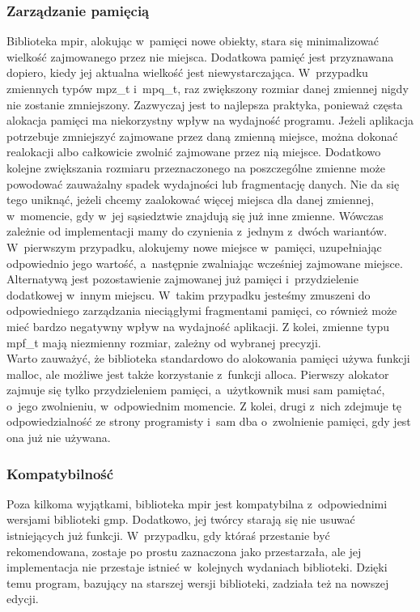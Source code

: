 \subsubsection{Zarządzanie pamięcią}
Biblioteka mpir, alokując w~pamięci nowe obiekty, stara się minimalizować wielkość zajmowanego przez nie miejsca. Dodatkowa pamięć jest przyznawana dopiero, kiedy jej aktualna wielkość jest niewystarczająca. W~przypadku zmiennych typów mpz\_t i~mpq\_t, raz zwiększony rozmiar danej zmiennej nigdy nie zostanie zmniejszony. Zazwyczaj jest to najlepsza praktyka, ponieważ częsta alokacja pamięci ma niekorzystny wpływ na wydajność programu. Jeżeli aplikacja potrzebuje zmniejszyć zajmowane przez daną zmienną miejsce, można dokonać realokacji albo całkowicie zwolnić zajmowane przez nią miejsce. Dodatkowo kolejne zwiększania rozmiaru przeznaczonego na poszczególne zmienne może powodować zauważalny spadek wydajności lub fragmentację danych. Nie da się tego uniknąć, jeżeli chcemy zaalokować więcej miejsca dla danej zmiennej, w~momencie, gdy w~jej sąsiedztwie znajdują się już inne zmienne. Wówczas zależnie od implementacji mamy do czynienia z~jednym z~dwóch wariantów. W~pierwszym przypadku, alokujemy nowe miejsce w~pamięci, uzupełniając odpowiednio jego wartość, a~następnie zwalniając wcześniej zajmowane miejsce. Alternatywą jest pozostawienie zajmowanej już pamięci i~przydzielenie dodatkowej w~innym miejscu. W~takim przypadku jesteśmy zmuszeni do odpowiedniego zarządzania nieciągłymi fragmentami pamięci, co również może mieć bardzo negatywny wpływ na wydajność aplikacji. Z kolei, zmienne typu mpf\_t mają niezmienny rozmiar, zależny od wybranej precyzji. \\
Warto zauważyć, że biblioteka standardowo do alokowania pamięci używa funkcji malloc, ale możliwe jest także korzystanie z~funkcji alloca. Pierwszy alokator zajmuje się tylko przydzieleniem pamięci, a~użytkownik musi sam pamiętać, o~jego zwolnieniu, w~odpowiednim momencie. Z kolei, drugi z~nich zdejmuje tę odpowiedzialność ze strony programisty i~sam dba o~zwolnienie pamięci, gdy jest ona już nie używana.

\subsubsection{Kompatybilność}
Poza kilkoma wyjątkami, biblioteka mpir jest kompatybilna z~odpowiednimi wersjami biblioteki gmp. Dodatkowo, jej twórcy starają się nie usuwać istniejących już funkcji. W~przypadku, gdy któraś przestanie być rekomendowana, zostaje po prostu zaznaczona jako przestarzała, ale jej implementacja nie przestaje istnieć w~kolejnych wydaniach biblioteki. Dzięki temu program, bazujący na starszej wersji biblioteki, zadziała też na nowszej edycji.

